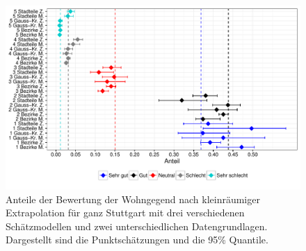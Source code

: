 \documentclass{Vorlage}
\begin{document}
\begin{figure}[h]
 \begin{center}
 \includegraphics[scale=0.8]{Pictures/WohngegendAlleModelle2}
 \caption{Anteile der Bewertung der Wohngegend nach kleinräumiger Extrapolation für ganz Stuttgart mit drei verschiedenen Schätzmodellen und zwei unterschiedlichen Datengrundlagen. Dargestellt sind die Punktschätzungen und die 95\% Quantile.}
 \label{WAlle}
 \end{center}
\end{figure}
\end{document}
